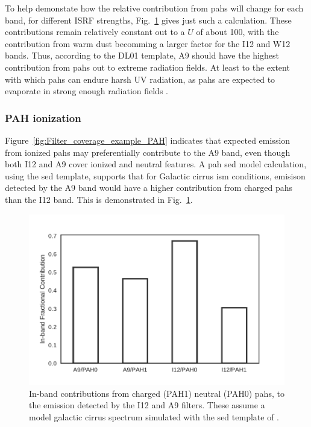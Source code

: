          To help demonstate how the relative contribution from \acrshort{pah}s will change for each band, for different ISRF strengths, Fig.~\ref{fig:InBandFracContribution_PAH} gives just such a calculation. These contributions remain relatively constant out to a $U$ of about 100, with the contribution from warm dust becomming a larger factor for the I12 and W12 bands. Thus, according to the DL01 template, A9 should have the highest contribution from \acrshort{pah}s out to extreme radiation fields. At least to the extent with which \acrshort{pah}s can endure harsh UV radiation, as \acrshort{pah}s are expected to evaporate in strong enough radiation fields \citep{allain96a,allain96b,bocchio12,pilleri12, pavlyuchenkov13}.

      \subsubsection{PAH ionization}
        Figure~\ref{fig:Filter_coverage_example_PAH} indicates that expected emission from ionized \acrshort{pah}s may preferentially contribute to the A9 band, even though both I12 and A9 cover ionized and neutral features. A \acrshort{pah} \acrshort{sed} model calculation, using the \cite{dustem11} \acrshort{sed} template, supports that for Galactic cirrus \acrshort{ism} conditions, emisison detected by the A9 band would have a higher contribution from charged \acrshort{pah}s than the I12 band. This is demonstrated in Fig.~\ref{fig:InBandFracContribution_PAH}.
          \begin{figure}
              \centering
              \includegraphics[width=\textwidth]{../Plots/ch_datasources/InBandFracContribution_PAH.pdf}
              \caption{In-band contributions from charged (PAH1) neutral (PAH0) \acrshort{pah}s, to the emission detected by the I12 and A9 filters. These assume a model galactic cirrus spectrum simulated with the \acrshort{sed} template of \cite{dustem11}. }
              \label{fig:InBandFracContribution_PAH}
          \end{figure}
